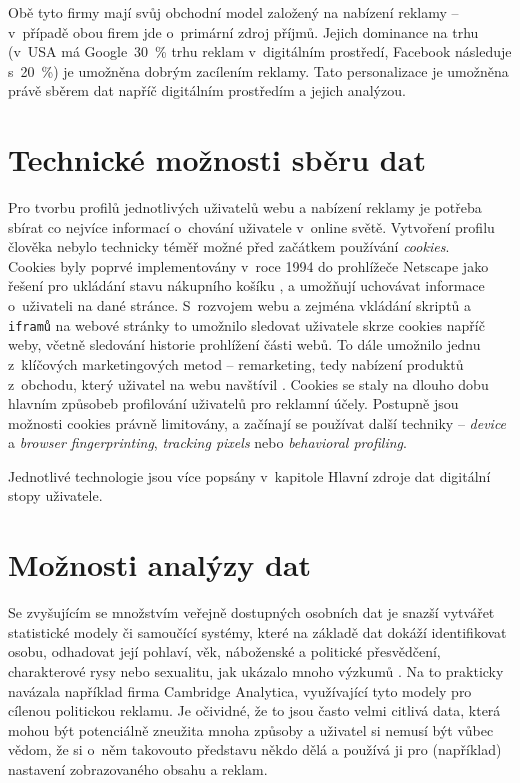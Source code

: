 Obě tyto firmy mají svůj obchodní model založený na nabízení reklamy -- v~případě obou firem jde o~primární zdroj příjmů. Jejich dominance na trhu (v~USA má Google~30~\% trhu reklam \citep{google-ads} v~digitálním prostředí, Facebook následuje s~20~\%) je umožněna dobrým zacílením reklamy. Tato personalizace je umožněna právě sběrem dat napříč digitálním prostředím a jejich analýzou.

\section{Technické možnosti sběru dat}

Pro tvorbu profilů jednotlivých uživatelů webu a nabízení reklamy je potřeba sbírat co nejvíce informací o~chování uživatele v~online světě. Vytvoření profilu člověka nebylo technicky téměř možné před začátkem používání \textit{cookies}.\\
Cookies byly poprvé implementovány v~roce 1994 do prohlížeče Netscape jako řešení pro ukládání stavu nákupního košíku \citep{cookies-history}, a umožňují uchovávat informace o~uživateli na dané stránce. S~rozvojem webu a zejména vkládání skriptů a \verb|iframů| na webové stránky to umožnilo sledovat uživatele skrze cookies napříč weby, včetně sledování historie prohlížení části webů.
To dále umožnilo jednu z~klíčových marketingových metod -- remarketing, tedy nabízení produktů z~obchodu, který uživatel na webu navštívil \citep{scott-cookies}. Cookies se staly na dlouho dobu hlavním způsobeb profilování uživatelů pro reklamní účely. Postupně jsou možnosti cookies právně limitovány, a začínají se používat další techniky -- \textit{device} a \textit{browser fingerprinting}, \textit{tracking pixels} nebo \textit{behavioral profiling}.

Jednotlivé technologie jsou více popsány v~kapitole Hlavní zdroje dat digitální stopy uživatele.

\section{Možnosti analýzy dat}
Se zvyšujícím se množstvím veřejně dostupných osobních dat je snazší vytvářet statistické modely či samoučící systémy, které na základě dat dokáží identifikovat osobu, odhadovat její pohlaví, věk, náboženské a politické přesvědčení, charakterové rysy nebo sexualitu, jak ukázalo mnoho výzkumů \citep{big-5-predictions}.
Na to prakticky navázala například firma Cambridge Analytica, využívající tyto modely pro cílenou politickou reklamu. Je očividné, že to jsou často velmi citlivá data, která mohou být potenciálně zneužita mnoha způsoby a uživatel si nemusí být vůbec vědom, že si o~něm takovouto představu někdo dělá a používá ji pro (například) nastavení zobrazovaného obsahu a reklam. 

